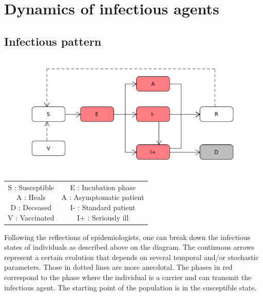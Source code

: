 \chapter{Dynamics of infectious agents}

\section{Infectious pattern}

\begin{figure}[h]
  \centering
  \includegraphics[width=\linewidth]{Media/SchemaInfection.png}
  \caption{}
  \label{fig:schemainfection}
\end{figure}

\begin{tabular}{cc}
\parbox{0.5\linewidth}{S : Susceptible\\
A : Heals\\
D : Deceased\\
V : Vaccinated\\}
&
\parbox{0.5\linewidth}{E : Incubation phase\\
A : Asymptomatic patient\\
I- : Standard patient\\
I+ : Seriously ill\\}
\end{tabular}

\bigskip

Following the reflections of epidemiologists, one can break down the infectious  states of individuals as described above on the diagram. The continuous arrows represent a certain evolution that depends on several temporal and/or stochastic parameters. Those in dotted lines are more anecdotal. The phases in red correspond to the phase where the individual is a carrier and can transmit the infectious agent. The starting point of the population is in the susceptible state.\\

